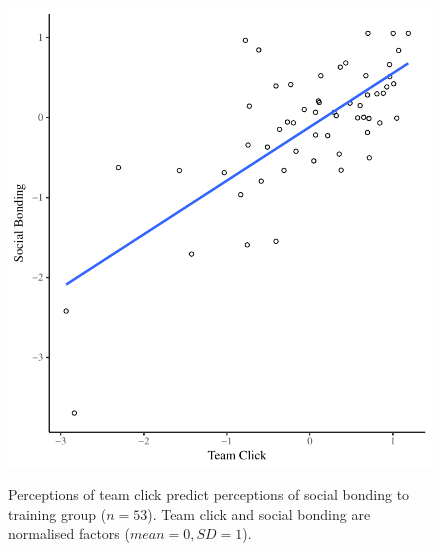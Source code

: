 \begin{figure}
  \centering
    \includegraphics[width=0.5\linewidth,keepaspectratio] {images/groupClickBondScatter}
    \label{fig:groupClickBondScatter}
    \caption{Perceptions of team click predict perceptions of social bonding to training group ($n = 53$).  Team click and social bonding are normalised factors ($mean = 0, SD = 1$).}
\end{figure}






